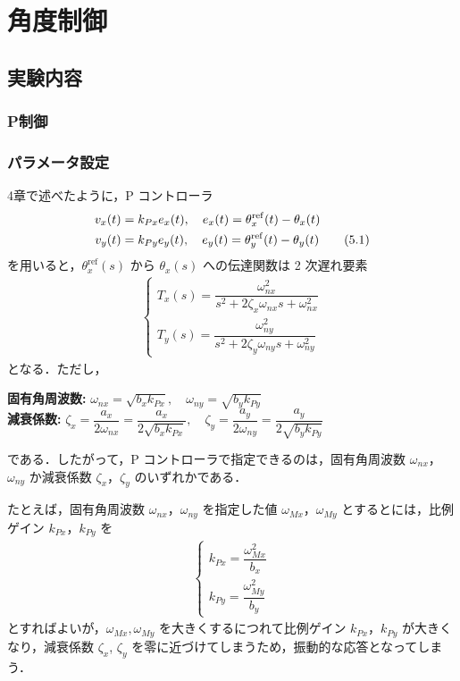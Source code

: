\section{角度制御}

\subsection{実験内容}
\subsubsection{P制御}
\subsubsection{パラメータ設定}

4章で述べたように，P コントローラ
\begin{align}
    v_x(t) &= k_{Px} e_x(t),\quad e_x(t) = \theta_x^{\mathrm{ref}}(t) - \theta_x(t) \notag \\
    v_y(t) &= k_{Py} e_y(t),\quad e_y(t) = \theta_y^{\mathrm{ref}}(t) - \theta_y(t)
    \tag{5.1}
\end{align}
を用いると，$\theta_x^{\mathrm{ref}}(s)$ から $\theta_x(s)$ への伝達関数は 2 次遅れ要素
\begin{align}
    \begin{cases}
        T_x(s) = \dfrac{\omega_{nx}^2}{s^2 + 2\zeta_x \omega_{nx} s + \omega_{nx}^2} \\
        T_y(s) = \dfrac{\omega_{ny}^2}{s^2 + 2\zeta_y \omega_{ny} s + \omega_{ny}^2}
    \end{cases}
    \tag{5.2}
\end{align}
となる．ただし，
\begin{tcolorbox}[colframe=black!75!white, colback=white!95!white, boxrule=0.5pt]
\textbf{固有角周波数:} 
$\omega_{nx} = \sqrt{b_x k_{Px}},\quad \omega_{ny} = \sqrt{b_y k_{Py}}$ \\
\textbf{減衰係数:} 
$\zeta_x = \dfrac{a_x}{2\omega_{nx}} = \dfrac{a_x}{2\sqrt{b_x k_{Px}}},\quad
\zeta_y = \dfrac{a_y}{2\omega_{ny}} = \dfrac{a_y}{2\sqrt{b_y k_{Py}}}$
\end{tcolorbox}
である．したがって，P コントローラで指定できるのは，固有角周波数 $\omega_{nx}$，$\omega_{ny}$ か減衰係数 $\zeta_x$，$\zeta_y$ のいずれかである．

たとえば，固有角周波数 $\omega_{nx}$，$\omega_{ny}$ を指定した値 $\omega_{Mx}$，$\omega_{My}$ とするとには，比例ゲイン $k_{Px}$，$k_{Py}$ を
\begin{align}
    \begin{cases}
        k_{Px} = \dfrac{\omega_{Mx}^2}{b_x} \\
        k_{Py} = \dfrac{\omega_{My}^2}{b_y}
    \end{cases}
    \tag{5.4}
\end{align}
とすればよいが，$\omega_{Mx}, \omega_{My}$ を大きくするにつれて比例ゲイン $k_{Px}$，$k_{Py}$ が大きくなり，減衰係数 $\zeta_x$, $\zeta_y$ を零に近づけてしまうため，振動的な応答となってしまう．

